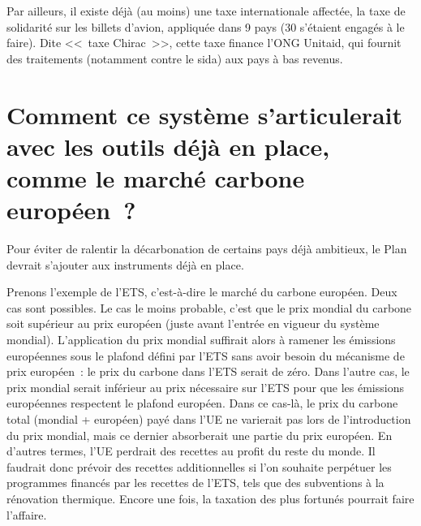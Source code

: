 \documentclass[a5paper,french]{memoir}
\begin{document}
Par ailleurs, il existe déjà (au moins) une taxe internationale affectée, la taxe de solidarité sur les billets d'avion, appliquée dans 9 pays (30 s'étaient engagés à le faire). Dite <<~taxe Chirac~>>, cette taxe finance l'ONG Unitaid, qui fournit des traitements (notamment contre le sida) aux pays à bas revenus. 

\section*{\normalsize Comment ce système s'articulerait avec les outils déjà en place, comme le marché carbone européen~?}\label{q:ets}

Pour éviter de ralentir la décarbonation de certains pays déjà ambitieux, le Plan devrait s'ajouter aux instruments déjà en place. 

Prenons l'exemple de l'ETS, c'est-à-dire le marché du carbone européen. Deux cas sont possibles. Le cas le moins probable, c'est que le prix mondial du carbone soit supérieur au prix européen (juste avant l'entrée en vigueur du système mondial). L'application du prix mondial suffirait alors à ramener les émissions européennes sous le plafond défini par l'ETS sans avoir besoin du mécanisme de prix européen~: le prix du carbone dans l'ETS serait de zéro. Dans l'autre cas, le prix mondial serait inférieur au prix nécessaire sur l'ETS pour que les émissions européennes respectent le plafond européen. Dans ce cas-là, le prix du carbone total (mondial + européen) payé dans l'UE ne varierait pas lors de l'introduction du prix mondial, mais ce dernier absorberait une partie du prix européen. En d'autres termes, l'UE perdrait des recettes au profit du reste du monde. Il faudrait donc prévoir des recettes additionnelles si l'on souhaite perpétuer les programmes financés par les recettes de l'ETS, tels que des subventions à la rénovation thermique. Encore une fois, la taxation des plus fortunés pourrait faire l'affaire.

\end{document}
